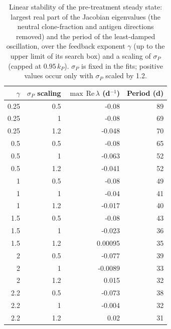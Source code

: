 \begin{table}[!htbp]
\centering
\small
\setlength{\tabcolsep}{3.5pt}
\caption{Linear stability of the pre-treatment steady state: largest real part of the Jacobian eigenvalues (the neutral clone-fraction and antigen directions removed) and the period of the least-damped oscillation, over the feedback exponent $\gamma$ (up to the upper limit of its search box) and a scaling of $\sigma_P$ (capped at $0.95\,k_P$). $\sigma_P$ is fixed in the fits; positive values occur only with $\sigma_P$ scaled by 1.2.}
\label{tab:stability}
\begin{tabular}{rrrr}
\toprule
$\gamma$ & $\sigma_P$ scaling & $\max\,\mathrm{Re}\,\lambda$ (d$^{-1}$) & Period (d) \\
\midrule
0.25 & 0.5 & -0.08 & 89 \\
0.25 & 1 & -0.08 & 69 \\
0.25 & 1.2 & -0.048 & 70 \\
0.5 & 0.5 & -0.08 & 65 \\
0.5 & 1 & -0.063 & 52 \\
0.5 & 1.2 & -0.041 & 52 \\
1 & 0.5 & -0.08 & 49 \\
1 & 1 & -0.04 & 41 \\
1 & 1.2 & -0.017 & 40 \\
1.5 & 0.5 & -0.08 & 43 \\
1.5 & 1 & -0.023 & 36 \\
1.5 & 1.2 & 0.00095 & 35 \\
2 & 0.5 & -0.077 & 39 \\
2 & 1 & -0.0089 & 33 \\
2 & 1.2 & 0.015 & 32 \\
2.2 & 0.5 & -0.073 & 38 \\
2.2 & 1 & -0.004 & 32 \\
2.2 & 1.2 & 0.02 & 31 \\
\bottomrule
\end{tabular}
\end{table}

